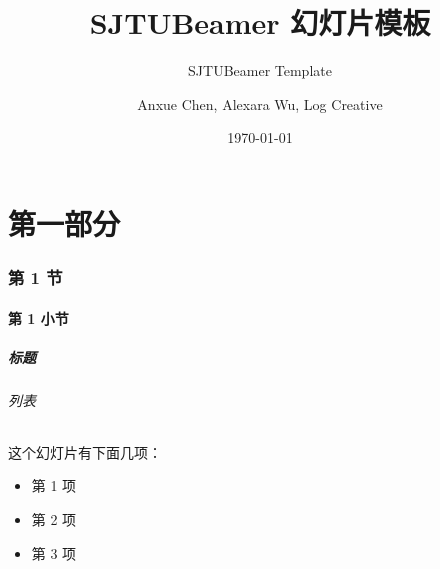 \documentclass[
    aspectratio=169,                   %
]{ctexbeamer}
\begin{document}
\title{SJTUBeamer 幻灯片模板}  %
\subtitle{SJTUBeamer Template}         %
\author{Anxue Chen, Alexara Wu, Log Creative}                  %
\date{\today}                          %
\maketitle                             %

\part{第一部分}


\AtBeginSubsection[]{                  %
  \begin{frame}
    \subsectionpage                %
  \end{frame}
}

\section{第 1 节}
\subsection{第 1 小节}

\begin{frame}
  \frametitle{标题}

  \paragraph{列表} 这个\alert{幻灯片}有下面几项：

  \begin{itemize}
    \item 第 1 项
    \item 第 2 项
    \item 第 3 项
  \end{itemize}

\end{frame}
\end{document}
